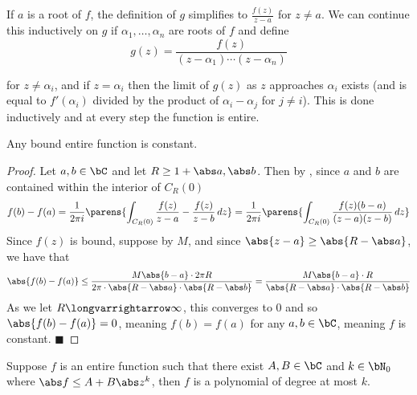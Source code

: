 \documentclass[10pt]{article}
\let\longto=\longvarrightarrow
\def\qed{\hskip1cm\hbox{}\hfill$\blacksquare$}
\begin{document}
If $a$ is a root of $f$, the definition of $g$ simplifies to $\frac{f(z)}{z-a}$ for $z\neq a$.
We can continue this inductively on $g$ if $\alpha_1,\dots,\alpha_n$ are roots of $f$ and define
\[ g(z) = \frac{f(z)}{(z-\alpha_1)\cdots(z-\alpha_n)} \]

\newpage
for $z\neq\alpha_i$, and if $z=\alpha_i$ then the limit of $g(z)$ as $z$ approaches $\alpha_i$ exists (and is equal to $f'(\alpha_i)$ divided by the product of $\alpha_i-\alpha_j$ for $j\neq i$).
This is done inductively and at every step the function is entire.

\begin{thrm*}

    Any bound entire function is constant.

\end{thrm*}

\begin{proof}

    Let $a,b\in\bC$ and let $R\geq1+\maxof{\abs a,\abs b}$.
    Then by , since $a$ and $b$ are contained within the interior of $C_R(0)$
    \[ f(b) - f(a) = \frac1{2\pi i}\parens{\int_{C_R(0)}\frac{f(z)}{z-a} - \frac{f(z)}{z-b}\,dz} = \frac1{2\pi i}\parens{\int_{C_R(0)}\frac{f(z)(b-a)}{(z-a)(z-b)}\,dz} \]
    Since $f(z)$ is bound, suppose by $M$, and since $\abs{z-a}\geq\abs{R-\abs a}$, we have that
    \[ \abs{f(b) - f(a)} \leq \frac{M\abs{b-a}\cdot2\pi R}{2\pi\cdot\abs{R-\abs a}\cdot\abs{R-\abs b}} = \frac{M\abs{b-a}\cdot R}{\abs{R-\abs a}\cdot\abs{R-\abs b}} \]
    As we let $R\longto\infty$, this converges to $0$ and so $\abs{f(b)-f(a)}=0$, meaning $f(b)=f(a)$ for any $a,b\in\bC$, meaning $f$ is constant.
    \qed

\end{proof}

\begin{thrm*}

    Suppose $f$ is an entire function such that there exist $A,B\in\bC$ and $k\in\bN_0$ where $\abs f\leq A+B\abs z^k$, then $f$ is a polynomial of degree at most $k$.

\end{thrm*}
\end{document}
